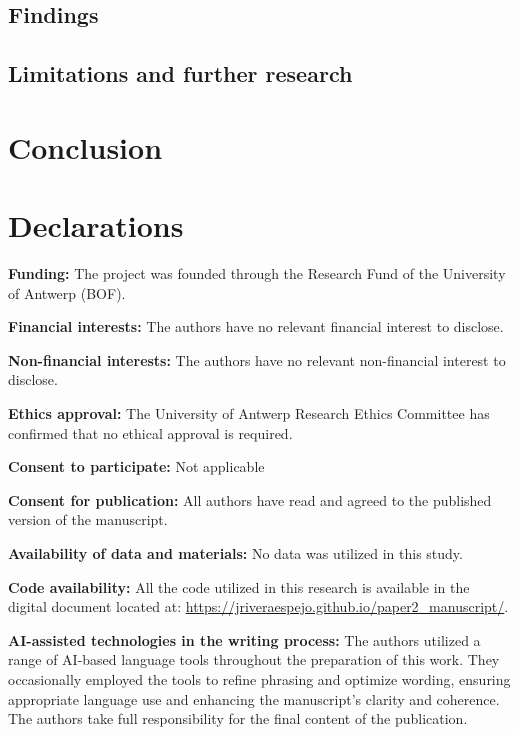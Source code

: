 \documentclass[
  authoryear,
  review,
  1p]{elsarticle}
\begin{document}
\subsection{Findings}\label{sec-discuss-finding}

\subsection{Limitations and further
research}\label{sec-discuss-limitations}

\section{Conclusion}\label{sec-conclusion}

\newpage{}

\section*{Declarations}\label{declarations}

\textbf{Funding:} The project was founded through the Research Fund of
the University of Antwerp (BOF).

\textbf{Financial interests:} The authors have no relevant financial
interest to disclose.

\textbf{Non-financial interests:} The authors have no relevant
non-financial interest to disclose.

\textbf{Ethics approval:} The University of Antwerp Research Ethics
Committee has confirmed that no ethical approval is required.

\textbf{Consent to participate:} Not applicable

\textbf{Consent for publication:} All authors have read and agreed to
the published version of the manuscript.

\textbf{Availability of data and materials:} No data was utilized in
this study.

\textbf{Code availability:} All the code utilized in this research is
available in the digital document located at:
\url{https://jriveraespejo.github.io/paper2_manuscript/}.

\textbf{AI-assisted technologies in the writing process:} The authors
utilized a range of AI-based language tools throughout the preparation
of this work. They occasionally employed the tools to refine phrasing
and optimize wording, ensuring appropriate language use and enhancing
the manuscript's clarity and coherence. The authors take full
responsibility for the final content of the publication.
\end{document}
